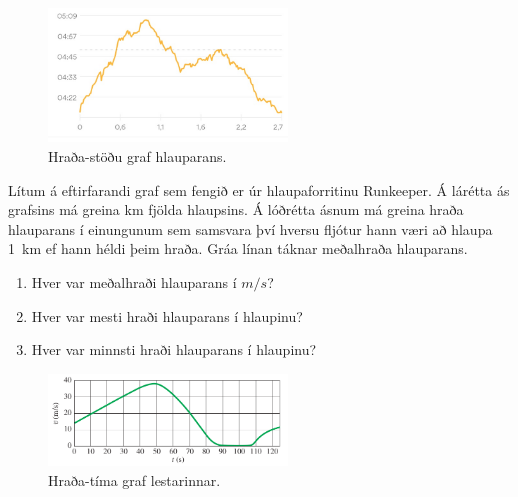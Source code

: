 \ifdefined \wholebook \else\documentclass[oneside]{book}\usepackage{EdlBook}\graphicspath{{figures/}}
\begin{document}
\begin{enumerate}[label = \textbf{Dæmi \thechapter.\arabic*.}]
\begin{minipage}{\linewidth}

\begin{figure}
\vspace{-0.5cm}
\centering
\includegraphics[width=2.5in]{images/hlaupa.jpg}
    \caption{Hraða-stöðu graf hlauparans.}
    \label{fig:myRunkeeper}

\end{figure}

\item Lítum á eftirfarandi graf sem fengið er úr hlaupaforritinu Runkeeper. Á lárétta ás grafsins má greina \si{km} fjölda hlaupsins. Á lóðrétta ásnum má greina hraða hlauparans í einungunum sem samsvara því hversu fljótur hann væri að hlaupa \SI{1}{km} ef hann héldi þeim hraða. Gráa línan táknar meðalhraða hlauparans.
\begin{enumerate}[label = \textbf{(\alph*)}]
    \item Hver var meðalhraði hlauparans í $\si{m/s}$?
    \item Hver var mesti hraði hlauparans í hlaupinu?
    \item Hver var minnsti hraði hlauparans í hlaupinu?
\end{enumerate}

\end{minipage}

\vspace{1cm}

\begin{minipage}{\linewidth}

\begin{figure}
\centering
\includegraphics[width=2.5in]{images/lest-graf.png}
    \caption{Hraða-tíma graf lestarinnar.}
    \label{fig:lest-hradi}

\end{figure}


\end{minipage}
\end{enumerate}
\end{document}
